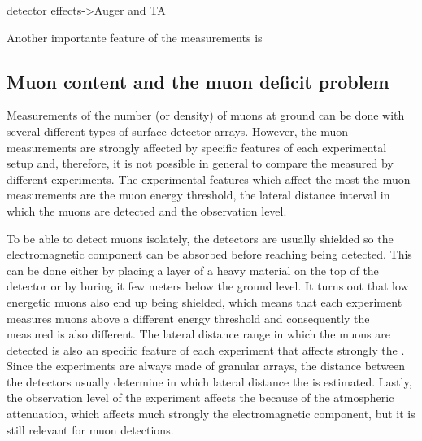 detector effects->Auger and TA

Another importante feature of the \xmax measurements is



\subsection{Muon content and the muon deficit problem}
\label{sec:shower:observables:nmu}

Measurements of the number (or density) of muons at ground can
be done with several different types of surface detector arrays.
However, the muon measurements are strongly affected by specific features
of each experimental setup and, therefore, it is not possible in general
to compare the \nmu measured by different experiments. The experimental features
which affect the most the muon measurements are the muon energy threshold,
the lateral distance interval in which the muons are detected and the observation
level. 

To be able to detect muons isolately, the detectors are usually shielded so the
electromagnetic component can be absorbed before reaching being detected. This can
be done either by placing a layer of a heavy material on the top of the detector
or by buring it few meters below the ground level. It turns out that low energetic muons
also end up being shielded, which means that each experiment measures
muons above a different energy threshold and consequently the measured \nmu
is also different. The lateral distance range in which the muons are detected is also
an specific feature of each experiment that affects strongly the \nmu. Since
the experiments are always made of granular arrays, the distance between the detectors
usually determine in which lateral distance the \nmu is estimated. Lastly,
the observation level of the experiment affects the \nmu because of the atmospheric attenuation,
which affects much strongly the electromagnetic component, but it is still relevant for
muon detections.

